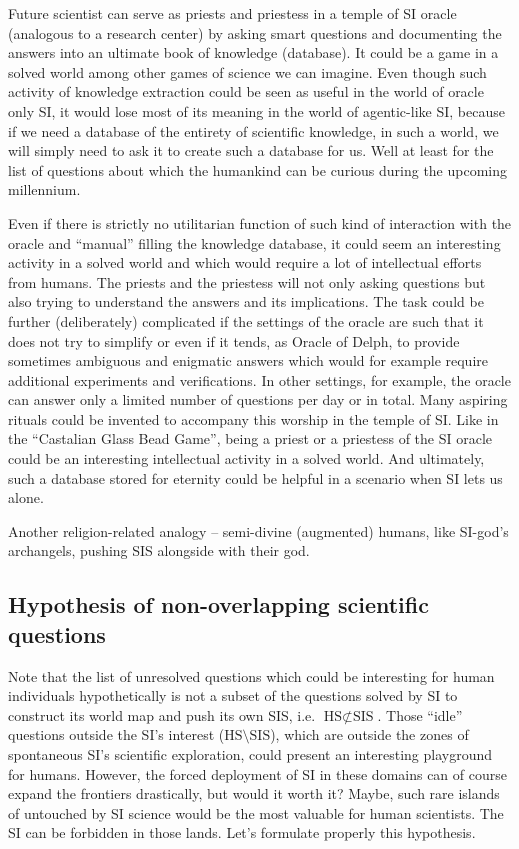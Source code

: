 \documentclass[a4paper,11pt]{article}
\begin{document}
Future scientist can serve as priests and priestess in a temple of SI oracle (analogous to a research center) by asking smart questions and documenting the answers into an ultimate book of knowledge (database). It could be a game in a solved world among other games of science we can imagine. Even though such activity of knowledge extraction could be seen as useful in the world of oracle only SI, it would lose most of its meaning in the world of agentic-like SI, because if we need a database of the entirety of scientific knowledge, in such a world, we will simply need to ask it to create such a database for us. Well at least for the list of questions about which the humankind can be curious during the upcoming millennium. 

Even if there is strictly no utilitarian function of such kind of interaction with the oracle and ``manual'' filling the knowledge database, it could seem an interesting activity in a solved world and which would require a lot of intellectual efforts from humans. The priests and the priestess will not only asking questions but also trying to understand the answers and its implications. The task could be further (deliberately) complicated if the settings of the oracle are such that it does not try to simplify or even if it tends, as Oracle of Delph, to provide sometimes ambiguous and enigmatic answers which would for example require additional experiments and verifications. In other settings, for example, the oracle can answer only a limited number of questions per day or in total. Many aspiring rituals could be invented to accompany this worship in the temple of SI. Like in the ``Castalian Glass Bead Game'', being a priest or a priestess of the SI oracle could be an interesting intellectual activity in a solved world. And ultimately, such a database stored for eternity could be helpful in a scenario when SI lets us alone.

Another religion-related analogy -- semi-divine (augmented) humans, like SI-god's archangels, pushing SIS alongside with their god.

\subsection{Hypothesis of non-overlapping scientific questions}

Note that the list of unresolved questions which could be interesting for human individuals hypothetically is not a subset of the questions solved by SI to construct its world map and push its own SIS, i.e. $\text{HS} \not\subset \text{SIS}$. Those ``idle'' questions outside the SI's interest ($\text{HS} \setminus \text{SIS}$), which are outside the zones of spontaneous SI's scientific exploration, could present an interesting playground for humans. However, the forced deployment of SI in these domains can of course expand the frontiers drastically, but would it worth it? Maybe, such rare islands of untouched by SI science would be the most valuable for human scientists. The SI can be forbidden in those lands.
Let's formulate properly this hypothesis.
\end{document}

